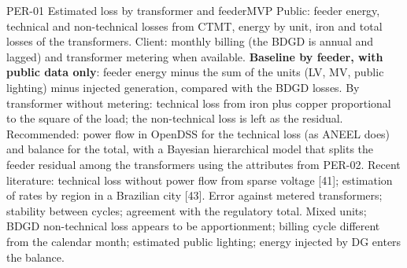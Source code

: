 \begin{ficha}{PER-01 \textperiodcentered{} Estimated loss by transformer and feeder}{MVP}
 Public: feeder energy, technical and non-technical losses
from CTMT, energy by unit, iron and total losses of the transformers.
Client: monthly billing (the BDGD is annual and lagged) and transformer
metering when available.
 \textbf{Baseline by feeder, with public data
only}: feeder energy minus the sum of the units (LV, MV,
public lighting) minus injected generation, compared with the BDGD
losses. By transformer without metering: technical loss from iron plus
copper proportional to the square of the load; the non-technical loss is left as the residual.
Recommended: power flow in OpenDSS for the technical loss (as ANEEL does)
and balance for the total, with a Bayesian hierarchical model that splits the
feeder residual among the transformers using the attributes from
PER-02. Recent literature: technical loss without power flow from
sparse voltage [41]; estimation of rates by region in a Brazilian city
[43].
 Error against metered transformers; stability between
cycles; agreement with the regulatory total.
 Mixed units; BDGD non-technical loss appears to be apportionment;
billing cycle different from the calendar month; estimated public lighting;
energy injected by DG enters the balance.
\end{ficha}

